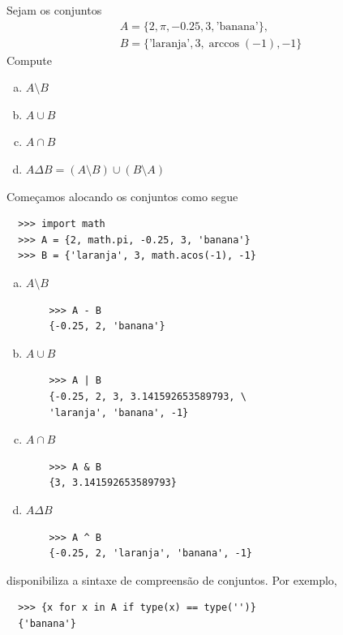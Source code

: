 \documentclass[12pt]{article}
\begin{document}
\begin{ex}
  Sejam os conjuntos
  \begin{gather}
    A = \{2, \pi, -0.25, 3, \text{'banana'}\},\\
    B = \{\text{'laranja'}, 3, \operatorname{arc cos}(-1), -1\}
  \end{gather}
  Compute
  \begin{enumerate}[a)]
  \item $A\setminus B$
  \item $A\cup B$
  \item $A\cap B$
  \item $A\Delta B = (A\setminus B) \cup (B\setminus A)$
  \end{enumerate}

   Começamos alocando os conjuntos como segue
  \begin{lstlisting}
  >>> import math
  >>> A = {2, math.pi, -0.25, 3, 'banana'}
  >>> B = {'laranja', 3, math.acos(-1), -1}
  \end{lstlisting}
  
  \begin{enumerate}[a)]
  \item $A\setminus B$
    \begin{lstlisting}
    >>> A - B
    {-0.25, 2, 'banana'}
    \end{lstlisting}
  \item $A\cup B$
    \begin{lstlisting}
    >>> A | B
    {-0.25, 2, 3, 3.141592653589793, \
    'laranja', 'banana', -1}
    \end{lstlisting}
  \item $A\cap B$
    \begin{lstlisting}
    >>> A & B
    {3, 3.141592653589793}
    \end{lstlisting}
  \item $A\Delta B$
    \begin{lstlisting}
    >>> A ^ B
    {-0.25, 2, 'laranja', 'banana', -1}
    \end{lstlisting}
  \end{enumerate}
\end{ex}

\begin{obs}\label{obs:compreensão_de_conjuntos}
  {\python} disponibiliza a sintaxe de compreensão de conjuntos. Por exemplo,
  \begin{lstlisting}
  >>> {x for x in A if type(x) == type('')}
  {'banana'}
  \end{lstlisting}
\end{obs}
\end{document}
